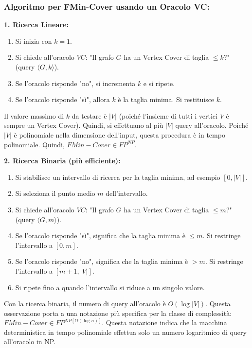\documentclass[a4paper]{article}
\theoremstyle{definition} %
\begin{document}
\subsubsection{Algoritmo per FMin-Cover usando un Oracolo VC:}
\textbf{1. Ricerca Lineare:}
\begin{enumerate}
    \item Si inizia con $k=1$.
    \item Si chiede all'oracolo $VC$: "Il grafo $G$ ha un Vertex Cover di taglia $\le k$?" (query $\langle G, k \rangle$).
    \item Se l'oracolo risponde "no", si incrementa $k$ e si ripete.
    \item Se l'oracolo risponde "sì", allora $k$ è la taglia minima. Si restituisce $k$.
\end{enumerate}
Il valore massimo di $k$ da testare è $|V|$ (poiché l'insieme di tutti i vertici $V$ è sempre un Vertex Cover). Quindi, si effettuano al più $|V|$ query all'oracolo. Poiché $|V|$ è polinomiale nella dimensione dell'input, questa procedura è in tempo polinomiale.
Quindi, $FMin-Cover \in FP^{NP}$.

\textbf{2. Ricerca Binaria (più efficiente):}
\begin{enumerate}
    \item Si stabilisce un intervallo di ricerca per la taglia minima, ad esempio $[0, |V|]$.
    \item Si seleziona il punto medio $m$ dell'intervallo.
    \item Si chiede all'oracolo $VC$: "Il grafo $G$ ha un Vertex Cover di taglia $\le m$?" (query $\langle G, m \rangle$).
    \item Se l'oracolo risponde "sì", significa che la taglia minima è $\le m$. Si restringe l'intervallo a $[0, m]$.
    \item Se l'oracolo risponde "no", significa che la taglia minima è $> m$. Si restringe l'intervallo a $[m+1, |V|]$.
    \item Si ripete fino a quando l'intervallo si riduce a un singolo valore.
\end{enumerate}
Con la ricerca binaria, il numero di query all'oracolo è $O(\log |V|)$.
Questa osservazione porta a una notazione più specifica per la classe di complessità:
$FMin-Cover \in FP^{NP[O(\log n)]}$. Questa notazione indica che la macchina deterministica in tempo polinomiale effettua solo un numero logaritmico di query all'oracolo in NP.
\end{document}
